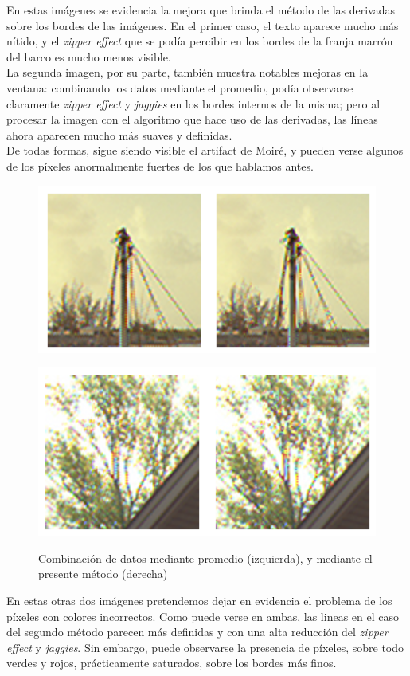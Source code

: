 \documentclass[a4paper]{article}
\begin{document}
En estas imágenes se evidencia la mejora que brinda el método de las derivadas sobre los bordes de las imágenes. En el primer caso, el texto aparece mucho más nítido, y el \textit{zipper effect} que se podía percibir en los bordes de la franja marrón del barco es mucho menos visible.\\
\indent La segunda imagen, por su parte, también muestra notables mejoras en la ventana: combinando los datos mediante el promedio, podía observarse claramente \textit{zipper effect} y \textit{jaggies} en los bordes internos de la misma; pero al procesar la imagen con el algoritmo que hace uso de las derivadas, las líneas ahora aparecen mucho más suaves y definidas. \\
De todas formas, sigue siendo visible el artifact de Moiré, y pueden verse algunos de los píxeles anormalmente fuertes de los que hablamos antes. \\

\begin{figure}[h!]
	\begin{center}
	    \includegraphics[scale=0.47]{imagenes/Splines/RecortesSplines/pesos1y0/barco1.png}\\
	\end{center}
	\begin{center}
	    \includegraphics[scale=0.47]{imagenes/Splines/RecortesSplines/pesos1y0/arbol.png}\\
	\end{center}
	\caption{Combinación de datos mediante promedio (izquierda), y mediante el presente método (derecha)}
	\label{splines3}
\end{figure}
\pagebreak
En estas otras dos imágenes pretendemos dejar en evidencia el problema de los píxeles con colores incorrectos. Como puede verse en ambas, las lineas en el caso del segundo método parecen más definidas y con una alta reducción del \textit{zipper effect} y \textit{jaggies}. Sin embargo, puede observarse la presencia de píxeles, sobre todo verdes y rojos, prácticamente saturados, sobre los bordes más finos. \\
\end{document}
